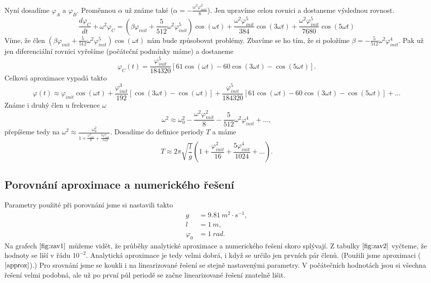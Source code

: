Nyní dosadíme $\varphi_A$ a $\varphi_B$. Proměnnou $\alpha$ už známe také ($\alpha = -\frac{\omega^2\varphi_{init}^2}{8}$). Jen upravíme celou rovnici a dostaneme výslednou rovnost.
\begin{equation}
\frac{d\varphi_C}{dt}+\omega^2\varphi_C=\left(\beta\varphi_{init}+\frac{5}{512}\omega^2\varphi_{init}^5\right)\cos(\omega t)+\frac{\omega^2\varphi_{init}^5}{384}\cos(3\omega t)+\frac{\omega^2\varphi_{init}^5}{7680}\cos(5\omega t)
\end{equation}
Víme, že člen $\left(\beta\varphi_{init}+\frac{5}{512}\omega^2\varphi_{init}^5\right)\cos(\omega t)$ nám bude způsobovat problémy. Zbavíme se ho tím, že si položíme $\beta=-\frac{5}{512}\omega^2\varphi_{init}^4$. Pak už jen diferenciální rovnici vyřešíme (počáteční podmínky máme) a dostaneme
\begin{equation}
\varphi_C(t)=\frac{\varphi_{init}^5}{184320}[61\cos(\omega t)-60\cos(3\omega t)-\cos(5\omega t)].
\end{equation}
Celková aproximace vypadá takto
\begin{equation}
\label{approx}
\varphi(t)\approx\varphi_{init}\cos(\omega t)+\frac{\varphi_{init}^3}{192}[\cos(3\omega t)-\cos(\omega t)]+\frac{\varphi_{init}^5}{184320}[61\cos(\omega t)-60\cos(3\omega t)-\cos(5\omega t)]+...
\end{equation}
Známe i druhý člen u frekvence $\omega$
\begin{equation}
\omega^2\approx\omega_0^2-\frac{\omega^2\varphi_{init}^2}{8}-\frac{5}{512}\omega^2\varphi_{init}^4+...,
\end{equation}
přepíšeme tedy na $\omega^2\approx\frac{\omega_0^2}{1+\frac{\varphi_{init}^2}{8}+\frac{5\varphi_{init}^4}{512}}$. Dosadíme do definice periody $T$ a máme
\begin{equation}
T\approx2\pi\sqrt{\frac{l}{g}}\left(1+\frac{\varphi_{init}^2}{16}+\frac{5\varphi_{init}^4}{1024}+...\right).
\end{equation}

\subsection{Porovnání aproximace a numerického řešení}
\label{sec:Porovnání aproximace a numerického řešení}
Parametry použité při porovnání jsme si nastavili takto
\begin{align}
g &= 9.81 \: \si{m^2}·\si{s^{-1}}, \\
l &= 1 \: \si{m}, \\
\varphi_0 &= 1 \: \si{rad}.
\end{align}
Na grafech $\ref{fig:zav1}$ můžeme vidět, že průběhy analytické aproximace a numerického řešení skoro splývají. Z tabulky $\ref{fig:zav2}$ vyčteme, že hodnoty se liší v řádu $10^{-2}$. Analytická aproximace je tedy velmi dobrá, i když se určilo jen prvních pár členů. (Použili jsme aproximaci ($\ref{approx}$).) Pro srovnání jsme se koukli i na linearizované řešení se stejně nastavenými parametry. V počátečních hodnotách jsou si všechna řešení velmi podobná, ale už po první půl periodě se začne linearizované řešení znatelně lišit.

